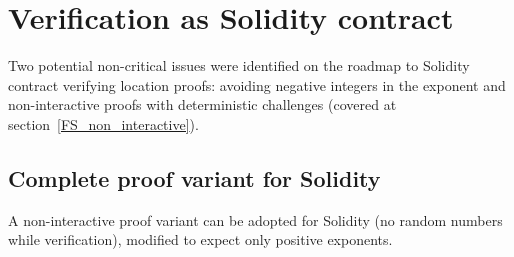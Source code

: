 \documentclass[a4paper,12pt]{article}
\begin{document}
\section{Verification as Solidity contract}

Two potential non-critical issues were identified on the roadmap to Solidity contract verifying location proofs:
avoiding negative integers in the exponent and
non-interactive proofs with deterministic challenges (covered at section~\ref{FS_non_interactive}).



\subsection{Complete proof variant for Solidity}

A non-interactive proof variant can be adopted for Solidity
(no random numbers while verification),
modified to expect only positive exponents.
\end{document}
